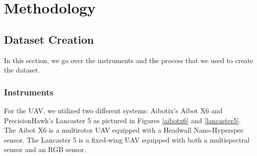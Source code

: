 \chapter{Methodology}


\section{Dataset Creation}
In this section, we go over the instruments and the process that we used to create the dataset.

\subsection{Instruments}
For the UAV, we utilized two different systems: Aibotix's Aibot X6 and PrecisionHawk's Lancaster 5 as pictured in Figures \ref{aibotx6} and \ref{lancaster5}. The Aibot X6 is a multirotor UAV equipped with a Headwall Nano-Hyperspec sensor. The Lancaster 5 is a fixed-wing UAV equipped with both a multispectral sensor and an RGB sensor.



